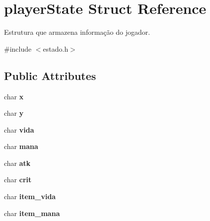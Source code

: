 \hypertarget{structplayerState}{}\section{player\+State Struct Reference}
\label{structplayerState}


Estrutura que armazena informação do jogador.  




{\ttfamily \#include $<$estado.\+h$>$}

\subsection*{Public Attributes}
\begin{DoxyCompactItemize}
\item 
char {\bfseries x}\hypertarget{structplayerState_adbe3cd61987e42a7b41cdc05895e65ae}{}\label{structplayerState_adbe3cd61987e42a7b41cdc05895e65ae}

\item 
char {\bfseries y}\hypertarget{structplayerState_ae3a4725d8ab0aba7c4f0d46a14a9a135}{}\label{structplayerState_ae3a4725d8ab0aba7c4f0d46a14a9a135}

\item 
char {\bfseries vida}\hypertarget{structplayerState_a8f9b3022d528b4063db5c0817be22d94}{}\label{structplayerState_a8f9b3022d528b4063db5c0817be22d94}

\item 
char {\bfseries mana}\hypertarget{structplayerState_ac4c208a26127f91705448b67c237bf55}{}\label{structplayerState_ac4c208a26127f91705448b67c237bf55}

\item 
char {\bfseries atk}\hypertarget{structplayerState_a104ce44392959cf23901ff874d095284}{}\label{structplayerState_a104ce44392959cf23901ff874d095284}

\item 
char {\bfseries crit}\hypertarget{structplayerState_ac43e977722018a5389e619adf5bb4008}{}\label{structplayerState_ac43e977722018a5389e619adf5bb4008}

\item 
char {\bfseries item\+\_\+vida}\hypertarget{structplayerState_a5efbac8c59be36f557970ac71b4d2652}{}\label{structplayerState_a5efbac8c59be36f557970ac71b4d2652}

\item 
char {\bfseries item\+\_\+mana}\hypertarget{structplayerState_aeea84720db87c481a30234f28b53b01a}{}\label{structplayerState_aeea84720db87c481a30234f28b53b01a}


\end{DoxyCompactItemize}
